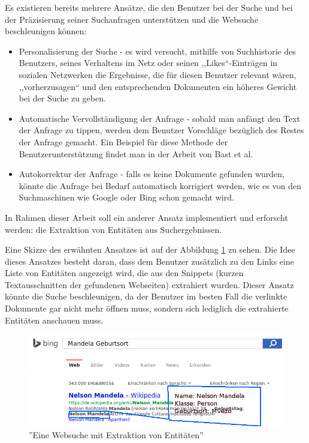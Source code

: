 Es existieren bereits mehrere Ansätze, die den Benutzer bei der Suche und bei der Präzisierung seiner Suchanfragen unterstützen und die Websuche beschleunigen können:
\begin{itemize}
\item Personalisierung der Suche\cite{noll2007web} - es wird versucht, mithilfe von Suchhistorie des Benutzers, seines Verhaltens im Netz oder seinen ,,Likes``-Einträgen in sozialen Netzwerken die Ergebnisse, die für diesen Benutzer relevant wären, ,,vorherzusagen`` und den entsprechenden Dokumenten ein höheres Gewicht bei der Suche zu geben.
\item Automatische Vervollständigung der Anfrage - sobald man anfängt den Text der Anfrage zu tippen, werden dem Benutzer Vorschläge bezüglich des Restes der Anfrage gemacht. Ein Beispiel für diese Methode der Benutzerunterstützung findet man in der Arbeit von Bast et al\cite{bast2006you}.
\item Autokorrektur der Anfrage - falls es keine Dokumente gefunden wurden, könnte die Anfrage bei Bedarf automatisch korrigiert werden, wie es von den Suchmaschinen wie Google oder Bing\cite{gao2010large} schon gemacht wird.
\end{itemize}

In Rahmen dieser Arbeit soll ein anderer Ansatz implementiert und erforscht werden: die Extraktion von Entitäten aus Suchergebnissen. 

Eine Skizze des erwähnten Ansatzes ist auf der Abbildung \ref{fig:bing-and-entity} zu sehen. Die Idee dieses Ansatzes besteht daran, dass dem Benutzer zusätzlich zu den Links eine Liste von Entitäten angezeigt wird, die aus den Snippets (kurzen Textausschnitten der gefundenen Webseiten) extrahiert wurden. Dieser Ansatz könnte die Suche beschleunigen, da der Benutzer im besten Fall die verlinkte Dokumente gar nicht mehr öffnen muss, sondern sich lediglich die extrahierte Entitäten anschauen muss.

\begin{figure}
\centering
\includegraphics[width=1\textwidth]{Bilder/bing-and-entity1.png}
\caption{''Eine Websuche mit Extraktion von Entitäten''}
\label{fig:bing-and-entity}
\end{figure}

